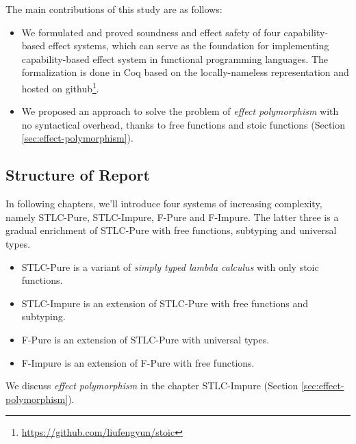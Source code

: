 The main contributions of this study are as follows:

\begin{itemize}
\item We formulated and proved soundness and effect safety of four
  capability-based effect systems, which can serve as the foundation
  for implementing capability-based effect system in functional
  programming languages. The formalization is done in Coq based on the
  locally-nameless representation\cite{chargueraud-11-ln} and hosted
  on github\footnote{\url{https://github.com/liufengyun/stoic}}.
\item We proposed an approach to solve the problem of \emph{effect
    polymorphism} with no syntactical overhead, thanks to free
  functions and stoic functions (Section
  \ref{sec:effect-polymorphism}).
\end{itemize}

\subsection{Structure of Report}

In following chapters, we'll introduce four systems of increasing
complexity, namely STLC-Pure, STLC-Impure, F-Pure and F-Impure. The
latter three is a gradual enrichment of STLC-Pure with free functions,
subtyping and universal types.

\begin{itemize}
\item STLC-Pure is a variant of \emph{simply typed lambda calculus}
  with only stoic functions.
\item STLC-Impure is an extension of STLC-Pure with free functions and subtyping.
\item F-Pure is an extension of STLC-Pure with universal types.
\item F-Impure is an extension of F-Pure with free functions.
\end{itemize}

We discuss \emph{effect polymorphism} in the chapter STLC-Impure
(Section \ref{sec:effect-polymorphism}).
